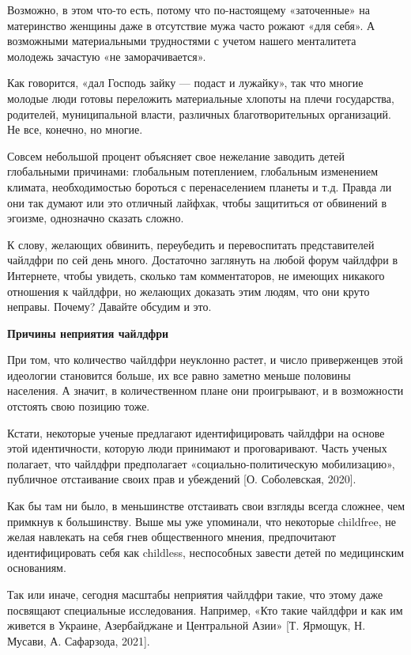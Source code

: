 Возможно, в этом что-то есть, потому что по-настоящему «заточенные» на материнство женщины даже в отсутствие мужа часто рожают «для себя». А возможными материальными трудностями с учетом нашего менталитета молодежь зачастую «не заморачивается».

Как говорится, «дал Господь зайку --- подаст и лужайку», так что многие молодые люди готовы переложить материальные хлопоты на плечи государства, родителей, муниципальной власти, различных благотворительных организаций. Не все, конечно, но многие.

Совсем небольшой процент объясняет свое нежелание заводить детей глобальными причинами: глобальным потеплением, глобальным изменением климата, необходимостью бороться с перенаселением планеты и т.д. Правда ли они так думают или это отличный лайфхак, чтобы защититься от обвинений в эгоизме, однозначно сказать сложно.

К слову, желающих обвинить, переубедить и перевоспитать представителей чайлдфри по сей день много. Достаточно заглянуть на любой форум чайлдфри в Интернете, чтобы увидеть, сколько там комментаторов, не имеющих никакого отношения к чайлдфри, но желающих доказать этим людям, что они круто неправы. Почему? Давайте обсудим и это.

\textbf{Причины неприятия чайлдфри}

При том, что количество чайлдфри неуклонно растет, и число приверженцев этой идеологии становится больше, их все равно заметно меньше половины населения. А значит, в количественном плане они проигрывают, и в возможности отстоять свою позицию тоже.

Кстати, некоторые ученые предлагают идентифицировать чайлдфри на основе этой идентичности, которую люди принимают и проговаривают. Часть ученых полагает, что чайлдфри предполагает «социально-политическую мобилизацию», публичное отстаивание своих прав и убеждений [О. Соболевская, 2020].

Как бы там ни было, в меньшинстве отстаивать свои взгляды всегда сложнее, чем примкнув к большинству. Выше мы уже упоминали, что некоторые childfree, не желая навлекать на себя гнев общественного мнения, предпочитают идентифицировать себя как childless, неспособных завести детей по медицинским основаниям.

Так или иначе, сегодня масштабы неприятия чайлдфри такие, что этому даже посвящают специальные исследования. Например, «Кто такие чайлдфри и как им живется в Украине, Азербайджане и Центральной Азии» [Т. Ярмощук, Н. Мусави, А. Сафарзода, 2021].

